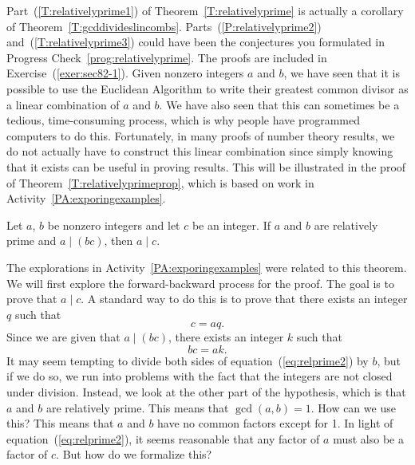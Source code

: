 Part~(\ref{T:relativelyprime1}) of Theorem~\ref{T:relativelyprime} is actually a corollary of Theorem~\ref{T:gcddivideslincombs}.  Parts~(\ref{P:relativelyprime2}) and~(\ref{T:relativelyprime3}) could have been the conjectures you formulated in 
Progress Check~\ref{prog:relativelyprime}.  The proofs are included in Exercise~(\ref{exer:sec82-1}).
\hbreak
%
Given nonzero integers  $a$  and  $b$, we have seen that it is possible to use the Euclidean Algorithm to write their greatest common divisor as a linear combination of  $a$  and  $b$.  We have also seen that this can sometimes be a tedious, time-consuming process, which is why people have programmed computers to do this.  Fortunately, in many proofs of number theory results, we do not actually have to construct this linear combination since simply knowing that it exists can be useful in proving results.  This will be illustrated in the proof of Theorem~\ref{T:relativelyprimeprop}, which is based on work in \typeu Activity~\ref*{PA:exporingexamples}.

\begin{theorem}\label{T:relativelyprimeprop}
Let  $a$, $b$ be nonzero integers and let $c$ be an integer.  If  $a$  and  $b$  are relatively prime  and  $a \mid \left( {bc} \right)$, then  $a \mid c$.
\end{theorem}

\setcounter{equation}{0}
The explorations in \typeu Activity~\ref*{PA:exporingexamples} were related to this theorem.  
We will first explore the forward-backward process for the proof.
The goal is to prove that  $a \mid c$.  A standard way to do this is to prove that there exists an integer  $q$  such that
%
\begin{equation}\label{eq:relprime1}
c = aq.
\end{equation}
%
Since we are given that  $a \mid \left( {bc} \right)$, there exists an integer  $k$  such that
\begin{equation}\label{eq:relprime2}
bc = ak.
\end{equation}
It may seem tempting to divide both sides of equation~(\ref{eq:relprime2})  by  $b$, but if we do so, we run into problems with the fact that the integers are not closed under division.  Instead, we look at the other part of the hypothesis, which is that  $a$  and  $b$  are relatively prime.  This means that   $\gcd( {a, b} ) = 1$.  How can we use this?  This means that  $a$  and  $b$  have no common factors except for  1.  In light of equation~(\ref{eq:relprime2}), it seems reasonable that any factor of  $a$ must also be a factor of  $c$.  But how do we formalize this?

